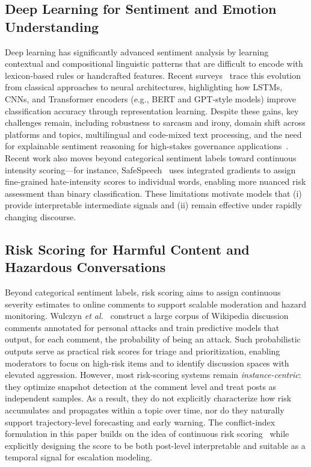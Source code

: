 \documentclass[journal]{IEEEtran}
\begin{document}
\subsection{Deep Learning for Sentiment and Emotion Understanding}
Deep learning has significantly advanced sentiment analysis by learning contextual and compositional linguistic patterns that are difficult to encode with lexicon-based rules or handcrafted features. Recent surveys~\cite{birjali2021sentiment,wahid2025crisis} trace this evolution from classical approaches to neural architectures, highlighting how LSTMs, CNNs, and Transformer encoders (e.g., BERT and GPT-style models) improve classification accuracy through representation learning. Despite these gains, key challenges remain, including robustness to sarcasm and irony, domain shift across platforms and topics, multilingual and code-mixed text processing, and the need for explainable sentiment reasoning for high-stakes governance applications~\cite{birjali2021sentiment}. Recent work also moves beyond categorical sentiment labels toward continuous intensity scoring---for instance, SafeSpeech~\cite{ghosh2024safespeech} uses integrated gradients to assign fine-grained hate-intensity scores to individual words, enabling more nuanced risk assessment than binary classification. These limitations motivate models that (i) provide interpretable intermediate signals and (ii) remain effective under rapidly changing discourse.

\subsection{Risk Scoring for Harmful Content and Hazardous Conversations}
Beyond categorical sentiment labels, risk scoring aims to assign continuous severity estimates to online comments to support scalable moderation and hazard monitoring. Wulczyn \emph{et al.}~\cite{Wulczyn2017} construct a large corpus of Wikipedia discussion comments annotated for personal attacks and train predictive models that output, for each comment, the probability of being an attack. Such probabilistic outputs serve as practical risk scores for triage and prioritization, enabling moderators to focus on high-risk items and to identify discussion spaces with elevated aggression. However, most risk-scoring systems remain \emph{instance-centric}: they optimize snapshot detection at the comment level and treat posts as independent samples. As a result, they do not explicitly characterize how risk accumulates and propagates within a topic over time, nor do they naturally support trajectory-level forecasting and early warning. The conflict-index formulation in this paper builds on the idea of continuous risk scoring~\cite{ghosh2024safespeech} while explicitly designing the score to be both post-level interpretable and suitable as a temporal signal for escalation modeling.
\end{document}
